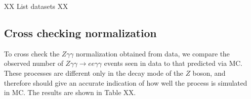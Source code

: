 XX List datasets XX

\subsection{Cross checking normalization}
\label{sec:ZggNorm}
To cross check the $Z\gamma\gamma$ normalization obtained from data, we compare the observed number of $Z\gamma\gamma\rightarrow ee \gamma\gamma$ events seen in data to that predicted via MC. These processes are different only in the decay mode of the $Z$ boson, and therefore should give an accurate indication of how well the process is simulated in MC. The results are shown in Table XX. 



%
